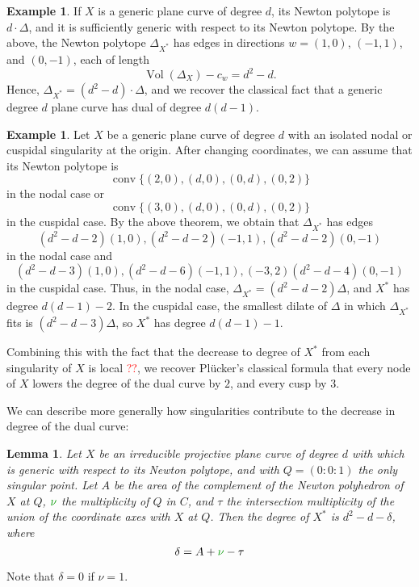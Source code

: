 \documentclass[oneside]{amsart}
\DeclareMathOperator{\vol}{Vol}
\DeclareMathOperator{\conv}{conv}
\newtheorem{lemma}[thm]{Lemma}
\theoremstyle{definition}
\newtheorem{ex}[thm]{Example}
\newcommand{\nathan}[1]{\textcolor{red}{#1}}
\newcommand{\bernd}[1]{\textcolor{green!60!black}{#1}}
\begin{document}
\begin{ex}
If $X$ is a generic plane curve of degree $d$, its Newton polytope is $d\cdot \Delta$, and it is sufficiently generic with respect to its Newton polytope. By the above, the Newton polytope $\Delta_{X^*}$ has edges in directions $w=(1,0)$, $(-1,1)$, and $(0,-1)$, each of length
\[
\vol(\Delta_X)-c_w=d^2-d.
\]
Hence, $\Delta_{X^*}=(d^2-d)\cdot \Delta$, and we recover the classical fact that a generic degree $d$ plane curve has dual of degree $d(d-1)$.
\end{ex}

\begin{ex}
Let $X$ be a generic plane curve of degree $d$ with an isolated nodal or cuspidal singularity at the origin. After changing coordinates, we can assume that its Newton polytope is
\[
\conv \{(2,0),(d,0),(0,d),(0,2)\}
\] 
in the nodal case or 
\[
\conv \{(3,0),(d,0),(0,d),(0,2)\}
\] 
in the cuspidal case. 
By the above theorem, we obtain that  $\Delta_{X^*}$ has edges
\[
(d^2-d-2)(1,0),(d^2-d-2)(-1,1),(d^2-d-2)(0,-1)
\]
in the nodal case and
\[
(d^2-d-3)(1,0),(d^2-d-6)(-1,1),(-3,2)(d^2-d-4)(0,-1)
\]
in the cuspidal case.
Thus, in the nodal case, $\Delta_{X^*}=(d^2-d-2)\Delta$, and $X^*$ has degree $d(d-1)-2$. 
In the cuspidal case, the smallest dilate of $\Delta$ in which $\Delta_{X^*}$ fits is $(d^2-d-3)\Delta$, so 
$X^*$ has degree $d(d-1)-1$.

Combining this with the fact that the decrease to degree of $X^*$ from each singularity of $X$ is local \nathan{??}, we recover Pl\"ucker's classical formula that every node of $X$ lowers the degree of the dual curve by $2$, and every cusp by $3$.
\end{ex}

We can describe more generally how singularities contribute to the decrease in degree of the dual curve:


\begin{lemma}
	\label{Lemma:dual_degree}
Let $X$ be an irreducible projective plane curve of degree $d$ with which is generic with respect to its Newton polytope, and with  $Q=(0:0:1)$ the only singular point.
Let $A$ be the area of the complement of the Newton polyhedron of $X$ at $Q$, $\bernd{\nu}$ the multiplicity of $Q$ in $C$, and $\tau$ the intersection multiplicity of the union of the coordinate axes with $X$ at $Q$. 
Then the degree of $X^*$ is $d^2-d-\delta$, where 
\[
\delta=A+\bernd{\nu}-\tau
\]
\end{lemma}

\bernd{Note that $ \delta = 0 $ if $ \nu = 1 $.}
\end{document}
